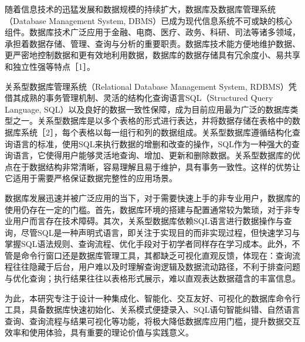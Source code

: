 \begin{CJK*}{UTF8}{song}
随着信息技术的迅猛发展和数据规模的持续扩大，数据库及数据库管理系统（Database Management System, DBMS）已成为现代信息系统不可或缺的核心组件。数据库技术广泛应用于金融、电商、医疗、政务、科研、司法等诸多领域，承担着数据存储、管理、查询与分析的重要职责。数据库技术能方便地维护数据、更严密地控制数据和更有效地利用数据，数据库的数据存储具有冗余度小、易共享和独立性强等特点［1］。

关系型数据库管理系统（Relational Database Management System, RDBMS）凭借其成熟的事务管理机制、灵活的结构化查询语言SQL（Structured Query Language, SQL）以及良好的数据一致性保障，成为目前应用最为广泛的数据库类型之一。关系型数据库是以多个表格的形式进行表达，并将数据存储在表格中的数据库系统［2］，每个表格以每一组行和列的数据组成。关系型数据库遵循结构化查询语言的标准，使用SQL来执行数据的增删和改查的操作，SQL作为一种强大的查询语言，它使得用户能够灵活地查询、增加、更新和删除数据。关系型数据库的优点在于数据结构非常清晰，容易理解且易于维护，具有事务一致性。这样的优势让它适用于需要严格保证数据完整性的应用场景。

数据库发展迅速并被广泛应用的当下，对于需要快速上手的非专业用户，数据库的使用仍存在一定的门槛。首先，数据库环境的搭建与配置通常较为繁琐，对于非专业用户而言存在技术障碍。其次，关系型数据库依赖SQL语言进行数据操作与查询，尽管SQL是一种声明式语言，即关注于实现目的而非实现过程，但快速学习与掌握SQL语法规则、查询流程、优化手段对于初学者同样存在学习成本。此外，不管是命令行窗口还是数据库管理工具，其都缺乏可视化直观反馈，体现在：查询流程往往隐藏于后台，用户难以及时理解查询逻辑及数据流动路径，不利于排查问题与优化查询；执行结果往往以表格形式展示，难以直观表达数据蕴含的丰富信息。

为此，本研究专注于设计一种集成化、智能化、交互友好、可视化的数据库命令行工具，具备数据库快速初始化、关系模式便捷录入、SQL语句智能纠错、自然语言查询、查询流程与结果可视化等功能，将极大降低数据库应用门槛，提升数据交互效率和使用体验，具有重要的理论价值与实践意义。

\end{CJK*}
